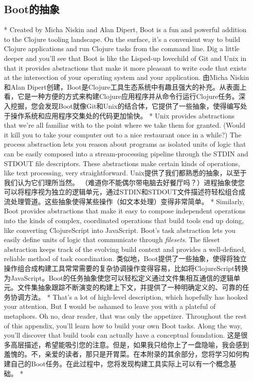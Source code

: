 \begin{paracol}{2}
\section{Boot的抽象}
\switchcolumn[0]*
Created by Micha Niskin and Alan Dipert, Boot is a fun and powerful
addition to the Clojure tooling landscape. On the surface, it's a
convenient way to build Clojure applications and run Clojure tasks from
the command line. Dig a little deeper and you'll see that Boot is like
the Lisped-up lovechild of Git and Unix in that it provides abstractions
that make it more pleasant to write code that exists at the intersection
of your operating system and your application.
\switchcolumn
由Micha Niskin和Alan Dipert创建，Boot是Clojure工具生态系统中有趣且强大的补充。从表面上看，它是一种方便的方式来构建Clojure应用程序并从命令行运行Clojure任务。深入挖掘，您会发现Boot就像Git和Unix的结合体，它提供了一些抽象，使得编写处于操作系统和应用程序交集处的代码更加愉快。
\switchcolumn[0]*
Unix provides abstractions that we're all familiar with to the point
where we take them for granted. (Would it kill you to take your computer
out to a nice restaurant once in a while?) The process abstraction lets
you reason about programs as isolated units of logic that can be easily
composed into a stream-processing pipeline through the STDIN and STDOUT
file descriptors. These abstractions make certain kinds of operations,
like text processing, very straightforward.
\switchcolumn
Unix提供了我们都熟悉的抽象，以至于我们认为它们理所当然。 （难道你不能偶尔带电脑去好餐厅吗？）进程抽象使您可以将程序视为独立的逻辑单元，通过STDIN和STDOUT文件描述符轻松组合成流处理管道。这些抽象使得某些操作（如文本处理）变得非常简单。
\switchcolumn[0]*
Similarly, Boot provides abstractions that make it easy to compose
independent operations into the kinds of complex, coordinated operations
that build tools end up doing, like converting ClojureScript into
JavaScript. Boot's task abstraction lets you easily define units of
logic that communicate through \emph{filesets}. The fileset abstraction
keeps track of the evolving build context and provides a well-defined,
reliable method of task coordination.
\switchcolumn
类似地，Boot提供了一些抽象，使得将独立操作组合成构建工具常常需要的复杂协调操作变得容易，比如将ClojureScript转换为JavaScript。Boot的任务抽象使您可以轻松定义通过文件集相互通信的逻辑单元。文件集抽象跟踪不断演变的构建上下文，并提供了一种明确定义的、可靠的任务协调方法。
\switchcolumn[0]*
That's a lot of high-level description, which hopefully has hooked your
attention. But I would be ashamed to leave you with a plateful of
metaphors. Oh no, dear reader, that was only the appetizer. Throughout
the rest of this appendix, you'll learn how to build your own Boot
tasks. Along the way, you'll discover that build tools can actually have
a conceptual foundation.
\switchcolumn
这是很多高层描述，希望能吸引您的注意。但是，如果我只给你上了一盘隐喻，我会感到羞愧的。不，亲爱的读者，那只是开胃菜。在本附录的其余部分，您将学习如何构建自己的Boot任务。在此过程中，您将发现构建工具实际上可以有一个概念基础。
\switchcolumn[0]*


\end{paracol}
